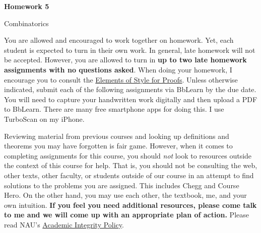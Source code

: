 \documentclass[11pt]{article}%
\theoremstyle{definition}
\newcommand{\blankline}{\pagebreak[2]\vspace{.5\baselineskip}}
\begin{document}
\begin{center}
{\Large\bf Homework 5}

\smallskip

Combinatorics
\end{center}

\thispagestyle{fancy}

You are allowed and encouraged to work together on homework. Yet, each student is expected to turn in their own work. In general, late homework will not be accepted. However, you are allowed to turn in \textbf{up to two late homework assignments with no questions asked}. When doing your homework, I encourage you to consult the \href{http://danaernst.com/teaching/ElementsOfStyle.pdf}{Elements of Style for Proofs}. Unless otherwise indicated, submit each of the following assignments via BbLearn by the due date. You will need to capture your handwritten work digitally and then upload a PDF to BbLearn. There are many free smartphone apps for doing this. I use TurboScan on my iPhone.

\blankline

Reviewing material from previous courses and looking up definitions and theorems you may have forgotten is fair game. However, when it comes to completing assignments for this course, you should \emph{not} look to resources outside the context of this course for help.  That is, you should not be consulting the web, other texts, other faculty, or students outside of our course in an attempt to find solutions to the problems you are assigned.  This includes Chegg and Course Hero. On the other hand, you may use each other, the textbook, me, and your own intuition. \textbf{If you feel you need additional resources, please come talk to me and we will come up with an appropriate plan of action.} Please read NAU's \href{https://www5.nau.edu/policies/Client/Details/828?whoIsLooking=Students&pertainsTo=All&sortDirection=Ascending&page=1}{Academic Integrity Policy}.

\blankline
\end{document}
